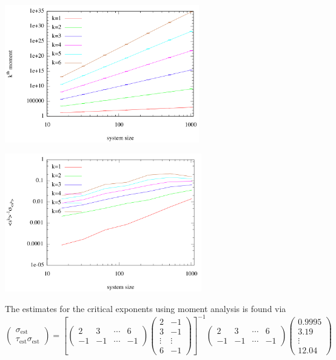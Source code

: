 \documentclass[twoside]{article}
\begin{document}
\begin{multicols}{2}
\begin{center}
  \includegraphics[height=60mm]{movl.png}
\end{center}
\begin{center}
  \includegraphics[height=60mm]{smovl.png}
\end{center}
\end{multicols}
The estimates for the critical exponents using moment analysis is found via 
\[
\begin{pmatrix}
\sigma_{\text{est}} \\
\tau_{\text{est}} \sigma_{\text{est}}
\end{pmatrix} =
\left[
\begin{pmatrix}
2 & 3 & \cdots & 6 \\
-1 & -1 & \cdots & -1
\end{pmatrix}
\begin{pmatrix}
2 & -1 \\
3  & -1 \\
\vdots & \vdots \\
6 & -1
\end{pmatrix}
\right]^{-1}
\begin{pmatrix}
2 & 3 & \cdots & 6 \\
-1 & -1 & \cdots & -1
\end{pmatrix}
\begin{pmatrix}
0.9995 \\
3.19 \\
\vdots \\
12.04
\end{pmatrix}
\]
\end{document}
